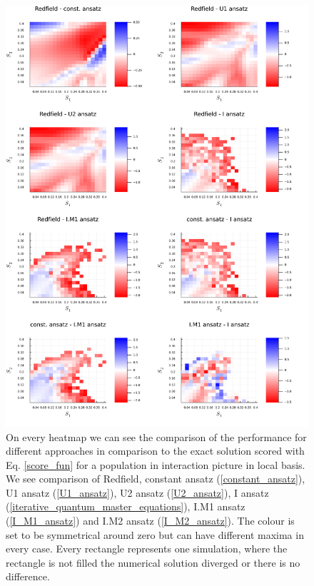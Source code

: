 \newpage
\begin{figure}[H]
\centering
\includegraphics[width=1.0\textwidth]{img/scans/hr_scan_1_scorediff_1.png}
\caption{On every heatmap we can see the comparison of the performance for different approaches in comparison to the exact solution scored with Eq. \ref{score_fun} for a population in interaction picture in local basis. We see comparison of Redfield, constant ansatz (\ref{constant_ansatz}), U1 ansatz (\ref{U1_ansatz}), U2 ansatz (\ref{U2_ansatz}), I ansatz (\ref{iterative_quantum_master_equations}), I.M1 ansatz (\ref{I_M1_ansatz}) and I.M2 ansatz (\ref{I_M2_ansatz}). The colour is set to be symmetrical around zero but can have different maxima in every case. Every rectangle represents one simulation, where the rectangle is not filled the numerical solution diverged or there is no difference.}
\label{img:hr_scan_1_scorediff_1}
\end{figure}

